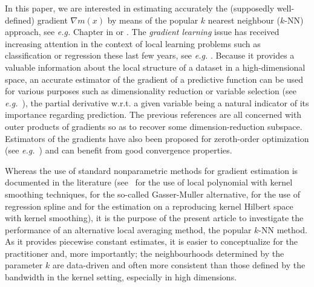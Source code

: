 In this paper, we are interested in estimating accurately the (supposedly well-defined) gradient $\nabla m(x)$ by means of the popular $k$ nearest neighbour ($k$-NN) approach, see \textit{e.g.} Chapter in \cite{devroyeProbabilisticTheoryPattern1996a} or \cite{biauLecturesNearestNeighbor2015}. The \textit{gradient learning} issue has received increasing attention in the context of local learning problems such as classification or regression these last few years, see \textit{e.g.} \cite{mukherjeeEstimationGradientsCoordinate2006,mukherjeeLearningCoordinateCovariances2006}. Because it provides a valuable information about the local structure of a dataset in a high-dimensional space, an accurate estimator of the gradient of a predictive function can be used for various purposes such as dimensionality reduction or variable selection (see \textit{e.g.}~\cite{hristacheStructureAdaptiveApproach2001, hristacheDirectEstimationIndex1998,xiaAdaptiveEstimationDimension2002,xiaConstructiveApproachEstimation2007,dalalyanNewAlgorithmEstimating2008,yeLearningSparseGradients2012, trivediConsistentEstimatorExpected2014}), the partial derivative w.r.t. a given variable being a natural indicator of its importance regarding prediction. The previous references are all concerned with outer products of gradients so as to recover some dimension-reduction subspace.
Estimators of the gradients have also been proposed for zeroth-order optimization (see \textit{e.g.}~\cite{nesterovRandomGradientFreeMinimization2017,wangStochasticZerothorderOptimization2018,berahasTheoreticalEmpiricalComparison2020}) and can benefit from good convergence properties.

Whereas the use of standard nonparametric methods for gradient estimation is documented in the literature (see~\cite{fanLocalPolynomialModelling1996,delecroixNonparametricEstimationRegression1996,debrabanterDerivativeEstimationLocal2013} for the use of local polynomial with kernel smoothing techniques, \cite{gasserEstimatingRegressionFunctions1984} for the so-called Gasser-Muller alternative, \cite{zhouDerivativeEstimationSpline2000} for the use of regression spline and \cite{mukherjeeLearningCoordinateCovariances2006} for the estimation on a reproducing kernel Hilbert space with kernel smoothing), it is the purpose of the present article to investigate the performance of an alternative local averaging method, the popular $k$-NN method. As it provides piecewise constant estimates, it is easier to conceptualize for the practitioner and, more importantly; the neighbourhoods determined by the parameter $k$ are data-driven and often more consistent than those defined by the bandwidth in the kernel setting, especially in high dimensions.

